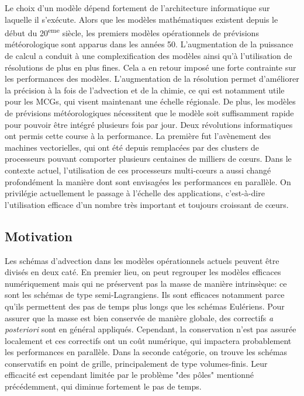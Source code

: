 Le choix d'un modèle dépend fortement de l'architecture informatique sur
laquelle il s'exécute. Alors que les modèles mathématiques existent depuis le
début du 20\textsuperscript{eme} siècle, les premiers modèles opérationnels de
prévisions mé\-téo\-ro\-lo\-gi\-que sont apparus dans les années 50.
L'augmentation de la puissance de calcul a conduit à une complexification des
modèles ainsi qu'à l'utilisation de résolutions de plus en plus fines. Cela a en
retour imposé une forte contrainte sur les performances des modèles.
L'augmentation de la résolution permet d'améliorer la précision à la fois de
l'advection et de la chimie, ce qui est notamment utile pour les MCGs, qui
visent maintenant une échelle régionale. De plus, les modèles de prévisions
météorologiques nécessitent que le modèle soit suffisamment rapide pour pouvoir
être intégré plusieurs fois par jour. Deux révolutions informatiques ont permis cette
course à la performance. La première fut l'avènement des machines vectorielles,
qui ont été depuis remplacées par des clusters de processeurs pouvant comporter
plusieurs centaines de milliers de c\oe{}urs. Dans le contexte actuel,
l'utilisation de ces processeurs multi-c\oe{}urs a aussi changé profondément la
manière dont sont envisagées les performances en parallèle. On privilégie
actuellement le passage à l'échelle des applications, c'est-à-dire l'utilisation
efficace d'un nombre très important et toujours croissant de c\oe{}urs.

\subsection*{Motivation}
Les schémas d'advection dans les modèles opérationnels actuels peuvent être
divisés en deux caté\DIFdelbegin {}\DIFdelend \DIFaddbegin {}\DIFaddend . En premier lieu, on peut regrouper les modèles
efficaces numériquement mais qui ne préservent pas la masse de manière
intrinsèque: ce sont les schémas de type semi-Lagrangiens. Ils sont efficaces
notamment parce qu'ils permettent des pas de temps plus longs que les schémas
Eulériens. Pour assurer que la masse est bien conservée de manière globale, des
correctifs \textit{a posteriori} sont en général appliqués. Cependant, la
conservation n'est pas assurée localement et ces correctifs ont un coût
numérique, qui impactera probablement les performances en parallèle. Dans la
seconde catégorie, on trouve les schémas conservatifs en point de grille,
principalement de type volumes-finis. Leur efficacité est cependant limitée par le
problème "des pôles" mentionné précédemment, qui diminue fortement le pas de
temps.

